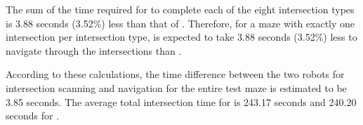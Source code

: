 \begin{table}[h!]
\caption{Comparison of both robot's intersection types statistics. (\textit{Path taken} is \textbf{L}eft, \textbf{S}traight, \textbf{R}ight, \textbf{B}ack from the perspective where the robot arrived at the intersection.)}
\label{tab:combined_intersection_times}
\end{table}


The sum of the time required for \TurnRob to complete each of the eight intersection types is 3.88 seconds (3.52\%) less than that of \FixRob. Therefore, for a maze with exactly one intersection per intersection type, \TurnRob is expected to take 3.88 seconds (3.52\%) less to navigate through the intersections than \FixRob.


According to these calculations, the time difference between the two robots for intersection scanning and navigation for the entire test maze is estimated to be 3.85 seconds. The average total intersection time for \FixRob is 243.17 seconds and 240.20 seconds for \TurnRob.